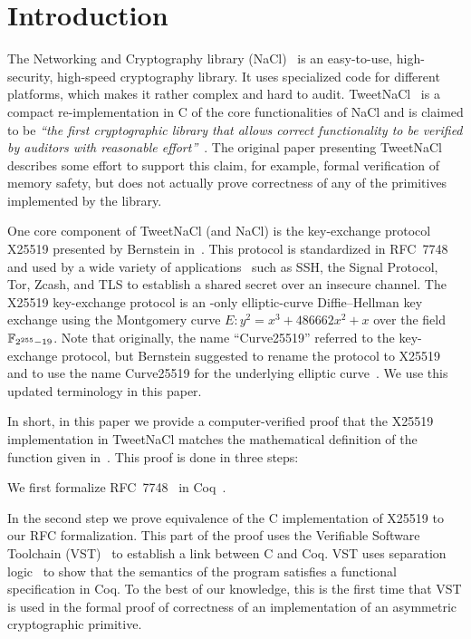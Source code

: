 \section{Introduction}
\label{sec:intro}

The Networking and Cryptography library (NaCl)~\cite{BLS12}
is an easy-to-use, high-security, high-speed cryptography library.
It uses specialized code for different platforms, which makes it rather complex and hard to audit.
TweetNaCl~\cite{BGJ+15} is a compact re-implementation in C
of the core functionalities of NaCl and is claimed to be
\emph{``the first cryptographic library that allows correct functionality
  to be verified by auditors with reasonable effort''}~\cite{BGJ+15}.
The original paper presenting TweetNaCl describes some effort to support
this claim, for example, formal verification of memory safety, but does not actually
prove correctness of any of the primitives implemented by the library.

One core component of TweetNaCl (and NaCl) is the key-exchange protocol X25519 presented
by Bernstein in~\cite{Ber06}.
This protocol is standardized in RFC~7748 and used by a wide variety of applications~\cite{things-that-use-curve25519}
such as SSH, the Signal Protocol, Tor, Zcash, and TLS to establish a shared secret over
an insecure channel.
The X25519 key-exchange protocol is an \xcoord-only
elliptic-curve Diffie--Hellman key exchange using the Montgomery
curve $E: y^2 = x^3 + 486662 x^2 + x$ over the field $\mathbb{F}_{2^{255}-19}$.
Note that originally, the name ``Curve25519'' referred to the key-exchange protocol,
but Bernstein suggested to rename the protocol to X25519 and to use the name
Curve25519 for the underlying elliptic curve~\cite{Ber14}.
We use this updated terminology in this paper.

In short, in this paper we provide a computer-verified proof that the
X25519 implementation in TweetNaCl matches the mathematical definition
of the function given in~\cite[Sec.~2]{Ber06}.
This proof is done in three steps:

We first formalize RFC~7748~\cite{rfc7748} in Coq~\cite{coq-faq}.

In the second step we prove equivalence of the C implementation of X25519
to our RFC formalization.
This part of the proof uses the Verifiable Software Toolchain (VST)~\cite{2012-Appel}
to establish a link between C and Coq.
VST uses separation logic~\cite{1969-Hoare,Reynolds02separationlogic}
to show that the semantics of the program satisfies a functional specification in Coq.
To the best of our knowledge, this is the first time that VST
is used in the formal proof of correctness of an implementation
of an asymmetric cryptographic primitive.

